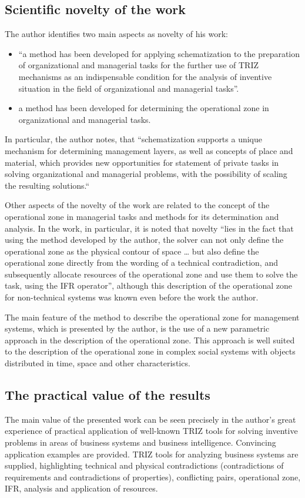 \subsection*{Scientific novelty of the work}
The author identifies two main aspects as novelty of his work:
\begin{itemize}
\item “a method has been developed for applying schematization to the
  preparation of organizational and managerial tasks for the further use of
  TRIZ mechanisms as an indispensable condition for the analysis of inventive
  situation in the field of organizational and managerial tasks”.
\item a method has been developed for determining the operational zone in
  organizational and managerial tasks.
\end{itemize}
In particular, the author notes, that “schematization supports a unique
mechanism for determining management layers, as well as concepts of place and
material, which provides new opportunities for statement of private tasks in
solving organizational and managerial problems, with the possibility of
scaling the resulting solutions.“

Other aspects of the novelty of the work are related to the concept of the
operational zone in managerial tasks and methods for its determination and
analysis. In the work, in particular, it is noted that novelty “lies in the
fact that using the method developed by the author, the solver can not only
define the operational zone as the physical contour of space {\ldots} but also
define the operational zone directly from the wording of a technical
contradiction, and subsequently allocate resources of the operational zone and
use them to solve the task, using the IFR operator”, although this description
of the operational zone for non-technical systems was known even before the
work the author.

The main feature of the method to describe the operational zone for management
systems, which is presented by the author, is the use of a new parametric
approach in the description of the operational zone. This approach is well
suited to the description of the operational zone in complex social systems
with objects distributed in time, space and other characteristics.

\subsection*{The practical value of the results}
The main value of the presented work can be seen precisely in the author’s
great experience of practical application of well-known TRIZ tools for solving
inventive problems in areas of business systems and business intelligence.
Convincing application examples are provided.  TRIZ tools for analyzing
business systems are supplied, highlighting technical and physical
contradictions (contradictions of requirements and contradictions of
properties), conflicting pairs, operational zone, IFR, analysis and
application of resources.

